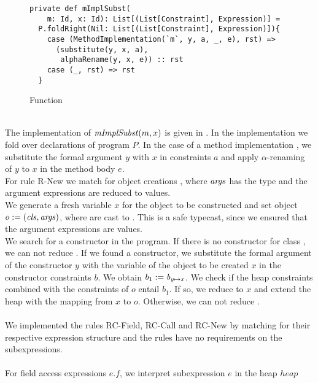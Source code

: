%
\begin{figure}[h]
\begin{lstlisting}
private def mImplSubst(
    m: Id, x: Id): List[(List[Constraint], Expression)] =
  P.foldRight(Nil: List[(List[Constraint], Expression)]){
    case (MethodImplementation(`m`, y, a, _, e), rst) =>
      (substitute(y, x, a),
       alphaRename(y, x, e)) :: rst
    case (_, rst) => rst
  }
\end{lstlisting}
\caption{Function }
\label{fig:scala-mimpl}
\end{figure}\\
%
The implementation of $\mathit{mImplSubst}(m, x)$ is given in .
In the implementation we fold over declarations of program $P$.
In the case of a method implementation ,
we substitute the formal argument $y$ with $x$ in constraints $a$
and apply $\alpha$-renaming of $y$ to $x$ in the method body $e$.\\
%
For rule R-New we match for object creations ,
where $\mathit{args}$ has the type 
and the argument expressions are reduced to values.\\
We generate a fresh variable $x$ for the object to be constructed
and set object $o := (\mathit{cls}, \mathit{args})$, %
where  are cast to .
This is a safe typecast, since we ensured
that the argument expressions are values.\\
We search for a constructor  in the program.
If there is no constructor for class ,
we can not reduce .
If we found a constructor,
we substitute the formal argument of the constructor $y$
with the variable of the object to be created $x$
in the constructor constraints $b$.
We obtain $b_1 := \mathit{b}_{\mathit{y} \mapsto \mathit{x}}$.
We check if the heap constraints combined
with the constraints of $o$ entail $b_1$.
If so, we reduce  to $x$
and extend the heap with the mapping from $x$ to $o$.
Otherwise, we can not reduce .\\
\\
We implemented the rules RC-Field, RC-Call and RC-New
by matching for their respective expression structure
and the rules have no requirements on the subexpressions.\\
\\
For field access expressions $e.f$,
we interpret subexpression $e$ in the heap $heap$
